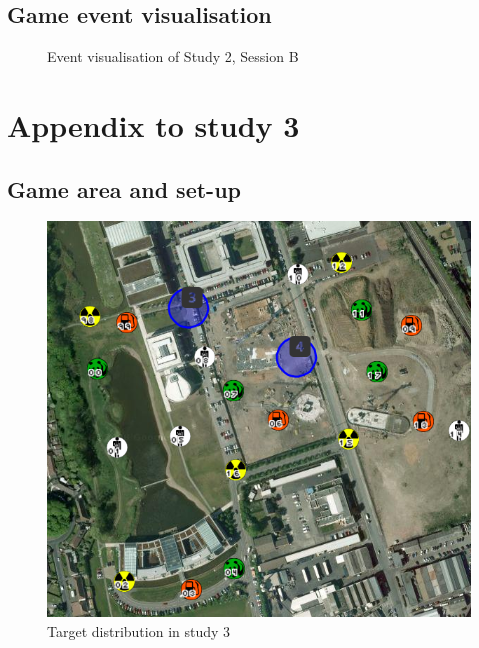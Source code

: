 \section{Game event visualisation}
\begin{figure}[H]
  \centering
  \caption{Event visualisation of Study 2, Session B}
 
\end{figure}

\chapter{Appendix to study 3}

\section{Game area and set-up}
\begin{figure}[H]
  \centering
  \includegraphics[width=1\textwidth]{img/Appendix/targets2}
  \caption{Target distribution in study 3}
\end{figure}


